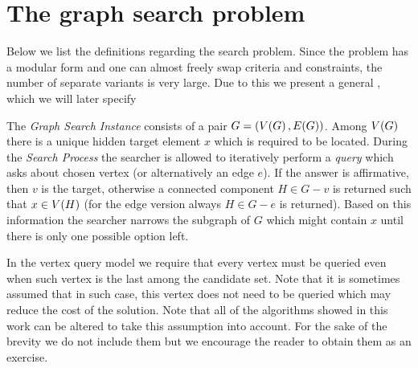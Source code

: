 \section{The graph search problem}

Below we list the definitions regarding the search problem.  Since the problem has a modular form and one can almost freely swap criteria and constraints, the number of separate variants is very large. Due to this we present a general , which we will later specify 

The \textit{Graph Search Instance} consists of a pair $G=\mathopen{}\left( V\mathopen{}\left( G \right),E\mathopen{}\left( G \right) \right)$. Among $V\mathopen{}\left( G \right)$ there is a unique hidden target element $x$ which is required
to be located. During the \textit{Search Process} the searcher is allowed to iteratively perform a \textit{query} which asks about chosen vertex (or alternatively an edge $e$). If the answer is affirmative, then $v$ is the target, otherwise a connected component $H\in G-v$ is returned such that $x\in V\mathopen{}\left( H \right)$ (for the edge version always $H\in G-e$ is returned). Based on this information the searcher narrows the subgraph of $G$ which might contain $x$ until there is only one possible option left. 

\begin{remark}
    In the vertex query model we require that every vertex must be queried even when such vertex is the last among the candidate set. Note that it is sometimes assumed that in such case, this vertex does not need to be queried which may reduce the cost of the solution. Note that all of the algorithms showed in this work can be altered to take this assumption into account. For the sake of the brevity we do not include them but we encourage the reader to obtain them as an exercise.
\end{remark} 


